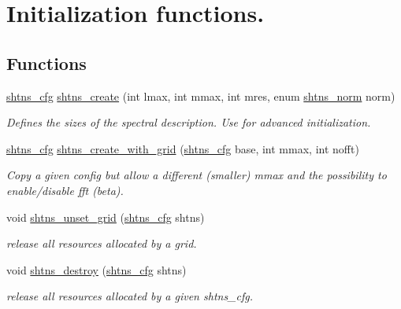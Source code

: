 \hypertarget{group__init}{}\section{Initialization functions.}
\label{group__init}
\subsection*{Functions}
\begin{DoxyCompactItemize}
\item 
\hyperlink{shtns_8h_ab7bd78e5cbeb4ed18782d018195fde00}{shtns\+\_\+cfg} \hyperlink{group__init_ga54b088013246e361b3c7387ac17bf9c1}{shtns\+\_\+create} (int lmax, int mmax, int mres, enum \hyperlink{shtns_8h_ae40339bdff1eddb866f48a5342792952}{shtns\+\_\+norm} norm)
\begin{DoxyCompactList}\small\item\em Defines the sizes of the spectral description. Use for advanced initialization. \end{DoxyCompactList}\item 
\hyperlink{shtns_8h_ab7bd78e5cbeb4ed18782d018195fde00}{shtns\+\_\+cfg} \hyperlink{group__init_ga8a22f101d85754461107eaa19e3bbd81}{shtns\+\_\+create\+\_\+with\+\_\+grid} (\hyperlink{shtns_8h_ab7bd78e5cbeb4ed18782d018195fde00}{shtns\+\_\+cfg} base, int mmax, int nofft)
\begin{DoxyCompactList}\small\item\em Copy a given config but allow a different (smaller) mmax and the possibility to enable/disable fft (beta). \end{DoxyCompactList}\item 
void \hyperlink{group__init_ga5915acd98e96ac6dc3b84d15001e3e92}{shtns\+\_\+unset\+\_\+grid} (\hyperlink{shtns_8h_ab7bd78e5cbeb4ed18782d018195fde00}{shtns\+\_\+cfg} shtns)
\begin{DoxyCompactList}\small\item\em release all resources allocated by a grid. \end{DoxyCompactList}\item 
void \hyperlink{group__init_ga223895ca67b73ad41666eca76c9bd409}{shtns\+\_\+destroy} (\hyperlink{shtns_8h_ab7bd78e5cbeb4ed18782d018195fde00}{shtns\+\_\+cfg} shtns)
\begin{DoxyCompactList}\small\item\em release all resources allocated by a given shtns\+\_\+cfg. \end{DoxyCompactList}\item 

\end{DoxyCompactItemize}
